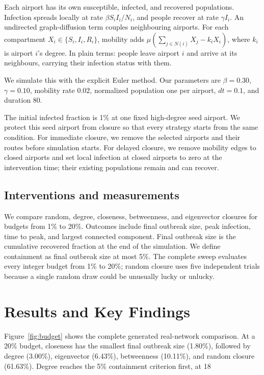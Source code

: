 \documentclass[conference]{IEEEtran}
\begin{document}
Each airport has its own susceptible, infected, and recovered populations. Infection spreads locally at rate $\beta S_iI_i/N_i$, and people recover at rate $\gamma I_i$. An undirected graph-diffusion term couples neighbouring airports. For each compartment $X_i\in\{S_i,I_i,R_i\}$, mobility adds $\mu\left(\sum_{j\in N(i)}X_j-k_iX_i\right)$, where $k_i$ is airport $i$'s degree. In plain terms: people leave airport $i$ and arrive at its neighbours, carrying their infection status with them.

We simulate this with the explicit Euler method. Our parameters are $\beta=0.30$, $\gamma=0.10$, mobility rate $0.02$, normalized population one per airport, $dt=0.1$, and duration 80.

The initial infected fraction is 1\% at one fixed high-degree seed airport. We protect this seed airport from closure so that every strategy starts from the same condition. For immediate closure, we remove the selected airports and their routes before simulation starts. For delayed closure, we remove mobility edges to closed airports and set local infection at closed airports to zero at the intervention time; their existing populations remain and can recover.

\subsection{Interventions and measurements}
We compare random, degree, closeness, betweenness, and eigenvector closures for budgets from 1\% to 20\%. Outcomes include final outbreak size, peak infection, time to peak, and largest connected component. Final outbreak size is the cumulative recovered fraction at the end of the simulation. We define containment as final outbreak size at most 5\%. The complete sweep evaluates every integer budget from 1\% to 20\%; random closure uses five independent trials because a single random draw could be unusually lucky or unlucky.

\section{Results and Key Findings}
Figure~\ref{fig:budget} shows the complete generated real-network comparison. At a 20\% budget, closeness has the smallest final outbreak size (1.80\%), followed by degree (3.00\%), eigenvector (6.43\%), betweenness (10.11\%), and random closure (61.63\%). Degree reaches the 5\% containment criterion first, at 18%
\end{document}
